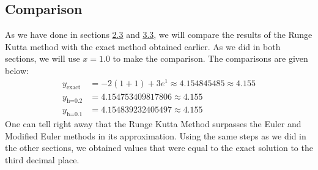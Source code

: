 \documentclass{article}
\begin{document}
\subsection{Comparison}
As we have done in sections \hyperref[sec:2.3]{2.3} and \hyperref[sec:3.3]{3.3}, we will compare the results of the Runge Kutta method with the exact method obtained earlier. As we did in both sections, we will use $x=1.0$ to make the comparison. The comparisons are given below:
\begin{equation*}
    \begin{split}
        y_{\text{exact}} &= -2(1+1)+3e^1 \approx 4.154845485 \approx 4.155 \\
        y_{\text{h=0.2}} &= 4.154753409817806 \approx 4.155 \\
        y_{\text{h=0.1}} &= 4.154839232405497 \approx 4.155
    \end{split}
\end{equation*}
One can tell right away that the Runge Kutta Method surpasses the Euler and Modified Euler methods in its approximation. Using the same steps as we did in the other sections, we obtained values that were equal to the exact solution to the third decimal place. 
\end{document}

